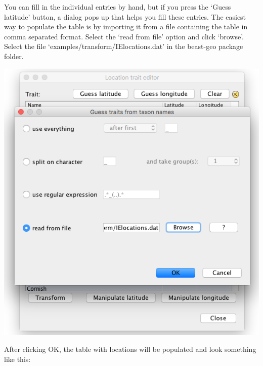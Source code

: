 \documentclass{article}
\begin{document}
You can fill in the individual entries by hand, but if you press the `Guess latitude' button, a dialog pops up that helps you fill these entries.
The easiest way to populate the table is by importing it from a file containing the table in comma separated format. Select the `read from file' option and click `browse'. Select the file `examples/transform/IElocations.dat' in the beast-geo package folder.

\begin{center}
\includegraphics[scale=0.4]{figures/BEAUti_transform3}
\end{center}

After clicking OK, the table with locations will be populated and look something like this:
\end{document}
